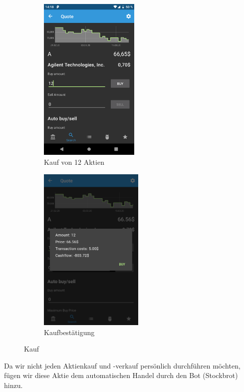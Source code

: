\documentclass[a4paper]{article}
\begin{document}
\begin{figure}[H]
	\begin{subfigure}{.5\textwidth}
		\centering
		\includegraphics[height=8cm,keepaspectratio]{./images/demo/buy_a.png}
		\caption{Kauf von 12 Aktien}
		\label{fig:demo:buy_a}
	\end{subfigure}
	\begin{subfigure}{.5\textwidth}
		\centering
		\includegraphics[height=8cm,keepaspectratio]{./images/demo/buy_a_confirm.png}
		\caption{Kaufbestätigung}
		\label{fig:demo:buy_a_confirm}
	\end{subfigure}
	\caption{Kauf}
	\label{fig:demo:buy}
\end{figure}

Da wir nicht jeden Aktienkauf und -verkauf persönlich durchführen möchten, fügen wir diese Aktie dem automatischen Handel durch den Bot (Stockbrot) hinzu. 
\end{document}
